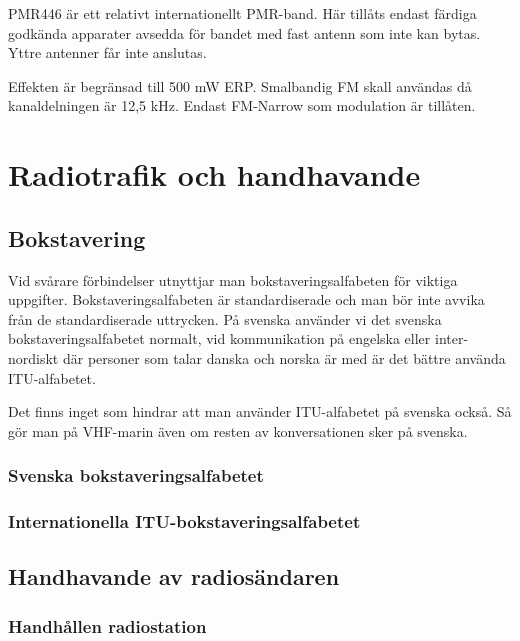 \documentclass[12ypt,swedish,a4paper]{report}
\begin{document}
PMR446 är ett relativt internationellt PMR-band. Här tillåts endast färdiga godkända apparater avsedda för bandet med fast antenn som inte kan bytas. Yttre antenner får inte anslutas.

Effekten är begränsad till 500 mW ERP. Smalbandig FM skall användas då kanaldelningen är 12,5 kHz.  Endast FM-Narrow som modulation är tillåten.

\chapter{Radiotrafik och handhavande}
\label{kap:radiotrafik}

\section{Bokstavering}

Vid svårare förbindelser utnyttjar man bokstaveringsalfabeten för viktiga uppgifter. Bokstaveringsalfabeten är standardiserade och man bör inte avvika från de standardiserade uttrycken. På svenska använder vi det svenska bokstaveringsalfabetet normalt, vid kommunikation på engelska eller inter-nordiskt där personer som talar danska och norska är med är det bättre använda ITU-alfabetet.

Det finns inget som hindrar att man använder ITU-alfabetet på svenska också. Så gör man på VHF-marin även om resten av konversationen sker på svenska.

\subsection{Svenska bokstaveringsalfabetet}


\subsection{Internationella ITU-bokstaveringsalfabetet}



\section{Handhavande av radiosändaren}

\subsection{Handhållen radiostation}
\end{document}
